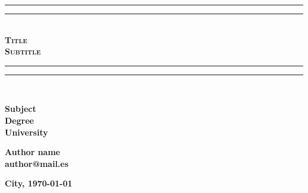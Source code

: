 \begin{titlepage}

  \centering

  \rule{\textwidth}{0.5px}\vspace*{-\baselineskip}\vspace*{2pt}
  \rule{\textwidth}{0.5px}\\[\baselineskip]

  \scshape
  \huge\textbf{Title}\\[0.8\baselineskip]
  \Large\textbf{Subtitle}\\[0.2\baselineskip]


  \rule{\textwidth}{0.5px}\vspace*{-\baselineskip}\vspace*{2pt}
  \rule{\textwidth}{0.5px}\\[\baselineskip]

  \vfill

  \textbf{\LARGE Subject\\[\baselineskip]\normalsize Degree\\University}

  \vfill

  \normalfont\textbf{Author name\\author@mail.es}

  \vfill

  \textbf{City, \normalsize \today}

  \vfill

\end{titlepage}

